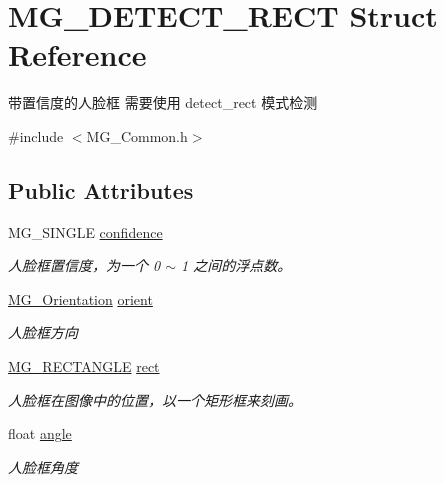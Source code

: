 \hypertarget{struct_m_g___d_e_t_e_c_t___r_e_c_t}{}\section{M\+G\+\_\+\+D\+E\+T\+E\+C\+T\+\_\+\+R\+E\+CT Struct Reference}
\label{struct_m_g___d_e_t_e_c_t___r_e_c_t}


带置信度的人脸框 需要使用 detect\+\_\+rect 模式检测  




{\ttfamily \#include $<$M\+G\+\_\+\+Common.\+h$>$}

\subsection*{Public Attributes}
\begin{DoxyCompactItemize}
\item 
\mbox{\label{struct_m_g___d_e_t_e_c_t___r_e_c_t_a54d73ea7ae3702ab54ae99fe3dcb4b6c}} 
M\+G\+\_\+\+S\+I\+N\+G\+LE \hyperlink{struct_m_g___d_e_t_e_c_t___r_e_c_t_a54d73ea7ae3702ab54ae99fe3dcb4b6c}{confidence}
\begin{DoxyCompactList}\small\item\em 人脸框置信度，为一个 0 $\sim$ 1 之间的浮点数。 \end{DoxyCompactList}\item 
\mbox{\label{struct_m_g___d_e_t_e_c_t___r_e_c_t_a79c920ccd342ef77ea203e7eb8cefa22}} 
\hyperlink{_m_g___common_8h_ac76255f4158ecd6b18aad652980c872b}{M\+G\+\_\+\+Orientation} \hyperlink{struct_m_g___d_e_t_e_c_t___r_e_c_t_a79c920ccd342ef77ea203e7eb8cefa22}{orient}
\begin{DoxyCompactList}\small\item\em 人脸框方向 \end{DoxyCompactList}\item 
\mbox{\label{struct_m_g___d_e_t_e_c_t___r_e_c_t_a90c44634f83155b36f846f553673c546}} 
\hyperlink{struct_m_g___r_e_c_t_a_n_g_l_e}{M\+G\+\_\+\+R\+E\+C\+T\+A\+N\+G\+LE} \hyperlink{struct_m_g___d_e_t_e_c_t___r_e_c_t_a90c44634f83155b36f846f553673c546}{rect}
\begin{DoxyCompactList}\small\item\em 人脸框在图像中的位置，以一个矩形框来刻画。 \end{DoxyCompactList}\item 
\mbox{\label{struct_m_g___d_e_t_e_c_t___r_e_c_t_a71ccc618998852d08e01b58a95e456fd}} 
float \hyperlink{struct_m_g___d_e_t_e_c_t___r_e_c_t_a71ccc618998852d08e01b58a95e456fd}{angle}
\begin{DoxyCompactList}\small\item\em 人脸框角度 \end{DoxyCompactList}\end{DoxyCompactItemize}


